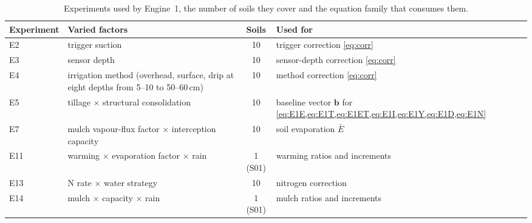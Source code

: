 \begin{table}[H]\centering\small
\caption{Experiments used by Engine~1, the number of soils they cover and the equation family that consumes them.}
\label{tab:expuse}
\begin{tabular}{lp{4.9cm}cp{5.2cm}}
\toprule
Experiment & Varied factors & Soils & Used for\\\midrule
E2 & trigger suction & 10 & trigger correction \cref{eq:corr}\\
E3 & sensor depth & 10 & sensor-depth correction \cref{eq:corr}\\
E4 & irrigation method (overhead, surface, drip at eight depths from 5--10 to 50--60\,cm) & 10 & method correction \cref{eq:corr}\\
E5 & tillage $\times$ structural consolidation & 10 & baseline vector $\mathbf b$ for \cref{eq:E1E,eq:E1T,eq:E1ET,eq:E1I,eq:E1Y,eq:E1D,eq:E1N}\\
E7 & mulch vapour-flux factor $\times$ interception capacity & 10 & soil evaporation $\bar E$\\
E11 & warming $\times$ evaporation factor $\times$ rain & 1 (S01) & warming ratios and increments\\
E13 & N rate $\times$ water strategy & 10 & nitrogen correction\\
E14 & mulch $\times$ capacity $\times$ rain & 1 (S01) & mulch ratios and increments\\\bottomrule
\end{tabular}
\end{table}

